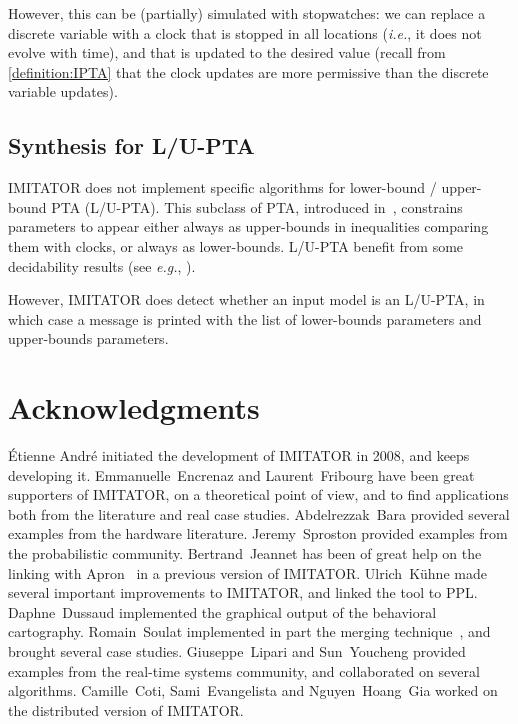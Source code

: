 \documentclass[a4paper,11pt]{report}
\makeatletter
\newcommand{\imitator}{\textsf{IMITATOR}}
\newcommand{\eg}{\textcolor{colorok}{\textit{e.g.},\@}}
\newcommand{\ie}{\textcolor{colorok}{\textit{i.e.},\@}}
\makeatother
\begin{document}
However, this can be (partially) simulated with stopwatches: we can replace a discrete variable with a clock that is stopped in all locations (\ie{} it does not evolve with time), and that is updated to the desired value (recall from \cref{definition:IPTA} that the clock updates are more permissive than the discrete variable updates).




\section{Synthesis for L/U-PTA}

\imitator{} does not implement specific algorithms for lower-bound / upper-bound PTA (L/U-PTA).
This subclass of PTA, introduced in~\cite{HRSV02}, constrains parameters to appear either always as upper-bounds in inequalities comparing them with clocks, or always as lower-bounds.
L/U-PTA benefit from some decidability results (see \eg{} \cite{HRSV02,BlT09,JLR15,AM15}).

However, \imitator{} does detect whether an input model is an L/U-PTA, in which case a message is printed with the list of lower-bounds parameters and upper-bounds parameters.



\chapter{Acknowledgments}

\sloppy
\'Etienne André initiated the development of \imitator{} in 2008, and keeps developing it.
Emmanuelle~Encrenaz and Laurent~Fribourg have been great supporters of \imitator{}, on a theoretical point of view, and to find applications both from the literature and real case studies.
Abdelrezzak~Bara provided several examples from the hardware literature.
Jeremy~Sproston provided examples from the probabilistic community.
Bertrand~Jeannet has been of great help on the linking with Apron~\cite{JM09} in a previous version of \imitator{}.
Ulrich~K\"uhne made several important improvements to \imitator{}, and linked the tool to PPL.
Daphne~Dussaud implemented the graphical output of the behavioral cartography.
Romain~Soulat implemented in part the merging technique~\cite{AFS13atva}, and brought several case studies.
Giuseppe~Lipari and Sun~Youcheng provided examples from the real-time systems community, and collaborated on several algorithms.
Camille~Coti, Sami~Evangelista and Nguyen~Hoang~Gia worked on the distributed version of \imitator{}.
\end{document}
